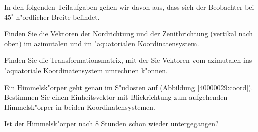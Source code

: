 In den folgenden Teilaufgaben gehen wir davon aus, dass sich der Beobachter
bei $45^\circ$ n"ordlicher Breite befindet.
\begin{teilaufgaben}
\item Finden Sie die Vektoren der Nordrichtung und der Zenithrichtung
(vertikal nach oben) im azimutalen und im "aquatorialen Koordinatensystem.
\item Finden Sie die Transformationsmatrix, mit der Sie Vektoren
vom azimutalen ins "aquatoriale Koordinatensystem umrechnen k"onnen.
\item Ein Himmelsk"orper geht genau im S"udosten auf
(Abbildung \ref{40000029:coord}).
Bestimmen Sie einen Einheitsvektor mit Blickrichtung zum
aufgehenden Himmelsk"orper in beiden Koordinatensystemen.
\item Ist der Himmelsk"orper nach 8 Stunden schon wieder untergegangen?
\end{teilaufgaben}

